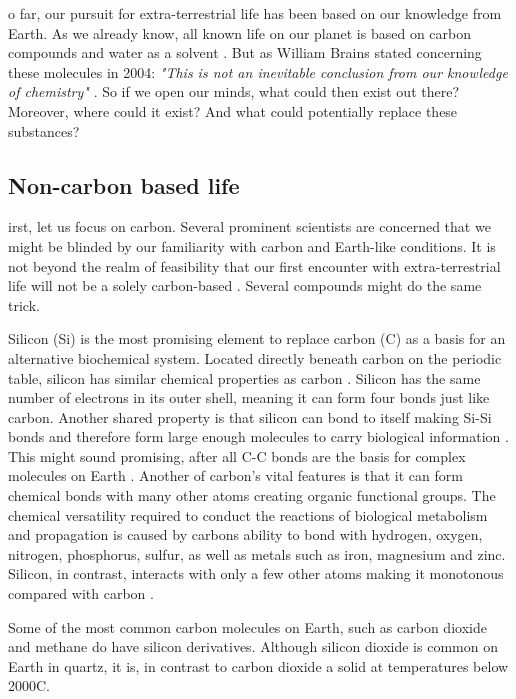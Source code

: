 o far, our pursuit for extra-terrestrial life has been based on our knowledge from Earth.
As we already know, all known life on our planet is based on carbon compounds and water as a solvent \cite{OForm2}.
But as William Brains stated concerning these molecules in 2004: \emph{"This is not an inevitable conclusion from our knowledge of chemistry"} \cite{OForm1}.
So if we open our minds, what could then exist out there?
Moreover, where could it exist?
And what could potentially replace these substances?

\subsection{Non-carbon based life}

irst, let us focus on carbon. Several prominent scientists are concerned that we might be blinded by our familiarity with carbon and Earth-like conditions.
It is not beyond the realm of feasibility that our first encounter with extra-terrestrial life will not be a solely carbon-based \cite{OForm3}.
Several compounds might do the same trick.

Silicon (Si) is the most promising element to replace carbon (C) as a basis for an alternative biochemical system. 
Located directly beneath carbon on the periodic table, silicon has similar chemical properties as carbon \cite{OForm4}.
Silicon has the same number of electrons in its outer shell, meaning it can form four bonds just like carbon.
Another shared property is that silicon can bond to itself making Si-Si bonds and therefore form large enough molecules to carry biological information \cite{OForm5}.
This might sound promising, after all C-C bonds are the basis for complex molecules on Earth \cite{OForm4}.
Another of carbon's vital features is that it can form chemical bonds with many other atoms creating organic functional groups.
The chemical versatility required to conduct the reactions of biological metabolism and propagation is caused by carbons ability to bond with hydrogen, oxygen, nitrogen, phosphorus, sulfur, as well as metals such as iron, magnesium and zinc.
Silicon, in contrast, interacts with only a few other atoms making it monotonous compared with carbon \cite{OForm5}.

Some of the most common carbon molecules on Earth, such as carbon dioxide and methane do have silicon derivatives.
Although silicon dioxide is common on Earth in quartz, it is, in contrast to carbon dioxide a solid at temperatures below 2000\degree C.

